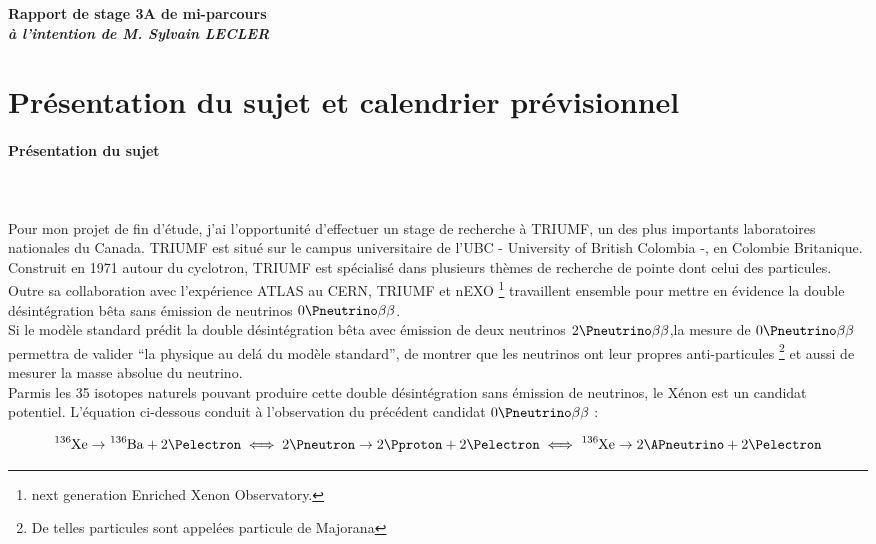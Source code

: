 \documentclass[a4paper, 11pt]{report}%
\begin{document}
\begin{center}
\bfseries Rapport de stage 3A de mi-parcours\\
\itshape \`a l'intention de M. Sylvain LECLER
\end{center}
 
\section{Pr\'esentation du sujet et calendrier pr\'evisionnel}

  \paragraph{Pr\'esentation du sujet}
  \hspace{1cm}\\ \\
  \indent Pour mon projet de fin d'\'etude, j'ai l'opportunit\' e d'effectuer un stage de recherche \`a TRIUMF, un des plus importants laboratoires nationales 
  du Canada. TRIUMF est situ\' e sur le campus universitaire de l'UBC - University of British Colombia -,  en Colombie Britanique. 
  \\
  Construit en 1971 autour du cyclotron, TRIUMF est sp\' ecialis\' e dans plusieurs th\` emes de recherche de pointe dont celui des particules. Outre sa collaboration 
  avec l'exp\' erience ATLAS au CERN, TRIUMF et nEXO \footnote{next generation Enriched Xenon Observatory.} travaillent ensemble pour mettre en \' evidence la 
  double d\' esint\' egration b\^ eta sans \' emission de neutrinos \(0\Pneutrino\beta\beta\). 
  \\ 
  Si le mod\` ele standard pr\' edit la double d\' esint\' egration b\^ eta avec \' emission de deux neutrinos \(2\Pneutrino\beta\beta\),la mesure de  
  \(0\Pneutrino\beta\beta\)permettra de valider ``la physique au del\'a du mod\` ele standard'', de montrer que les neutrinos ont leur propres anti-particules \footnote{De telles particules sont 
  appel\' ees particule de Majorana} et aussi de mesurer la masse absolue du neutrino. 
  \\
  Parmis les 35 isotopes naturels pouvant produire cette double d\'esint\'egration sans \'emission de neutrinos, le X\'enon  est un candidat potentiel.
  L'\'equation ci-dessous conduit \`a l'observation du pr\'ec\'edent candidat \(0\Pneutrino\beta\beta\) :

  \begin{equation}
  \ce{^{136}Xe} \rightarrow \ce{^{136}Ba} + 2\Pelectron \iff 2\Pneutron \rightarrow 2\Pproton + 2\Pelectron \iff \ce{^{136}Xe} \rightarrow 2\APneutrino + 2\Pelectron 
  \end{equation}
   
\end{document}
